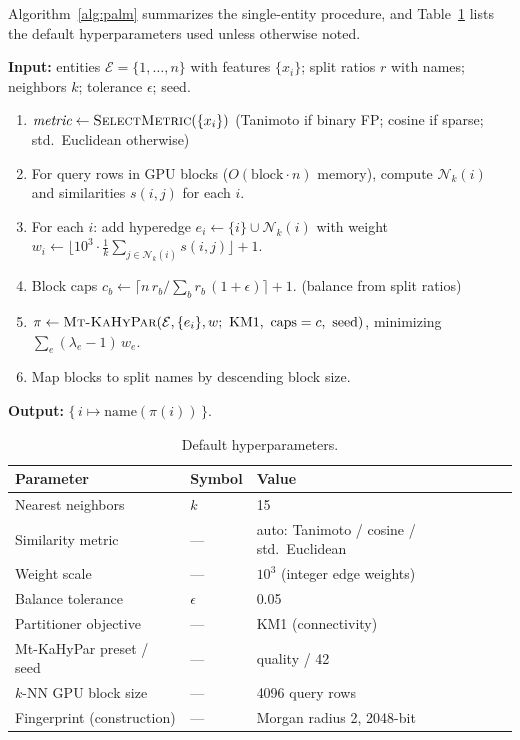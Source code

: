 \documentclass{article}
\begin{document}
Algorithm~\ref{alg:palm} summarizes the single-entity procedure, and
Table~\ref{tab:hparams} lists the default hyperparameters used unless otherwise noted.

\begin{algorithm}[!ht]
\caption{PALM split (single-entity)}
\label{alg:palm}
\small
\textbf{Input:} entities $\mathcal{E}=\{1,\dots,n\}$ with features $\{x_i\}$; split ratios $r$ with names; neighbors $k$; tolerance $\epsilon$; seed.
\begin{enumerate}\setlength\itemsep{1pt}\setlength\parskip{0pt}\setlength\topsep{2pt}
  \item $\textit{metric} \gets \textsc{SelectMetric}(\{x_i\})$ \hfill {\footnotesize(Tanimoto if binary FP; cosine if sparse; std.\ Euclidean otherwise)}
  \item For query rows in GPU blocks ($O(\text{block}\cdot n)$ memory), compute $\mathcal{N}_k(i)$ and similarities $s(i,j)$ for each $i$.
  \item For each $i$: add hyperedge $e_i \gets \{i\} \cup \mathcal{N}_k(i)$ with weight $w_i \gets \lfloor 10^3 \cdot \tfrac{1}{k}\!\sum_{j\in\mathcal{N}_k(i)} s(i,j)\rfloor + 1$.
  \item Block caps $c_b \gets \lceil n\, r_b/\!\sum_b r_b \,(1{+}\epsilon)\rceil + 1$. \hfill {\footnotesize(balance from split ratios)}
  \item $\pi \gets \textsc{Mt-KaHyPar}(\mathcal{E}, \{e_i\}, w;\ \text{KM1},\ \text{caps}=c,\ \text{seed})$, minimizing $\sum_e (\lambda_e{-}1)\,w_e$.
  \item Map blocks to split names by descending block size.
\end{enumerate}
\textbf{Output:} $\{\, i \mapsto \text{name}(\pi(i)) \,\}$.
\end{algorithm}

\begin{table}[!ht]
  \caption{Default hyperparameters.}
  \label{tab:hparams}
  \centering
  \small
  \begin{tabular}{lll}
    \toprule
    Parameter & Symbol & Value \\
    \midrule
    Nearest neighbors          & $k$        & 15 \\
    Similarity metric          & ---        & auto: Tanimoto / cosine / std.\ Euclidean \\
    Weight scale               & ---        & $10^3$ (integer edge weights) \\
    Balance tolerance          & $\epsilon$ & 0.05 \\
    Partitioner objective      & ---        & KM1 (connectivity) \\
    Mt-KaHyPar preset / seed   & ---        & quality / 42 \\
    $k$-NN GPU block size      & ---        & 4096 query rows \\
    Fingerprint (construction) & ---        & Morgan radius 2, 2048-bit \\
    \bottomrule
  \end{tabular}
\end{table}
\end{document}
